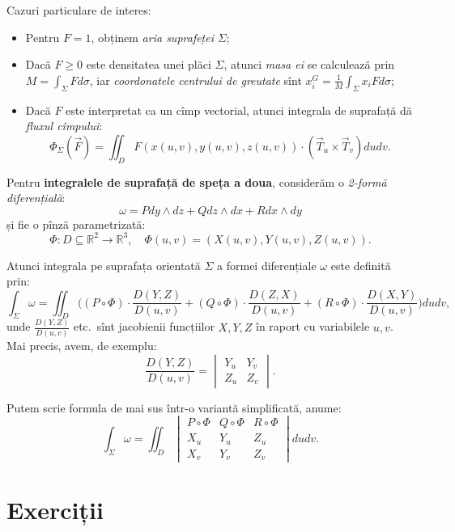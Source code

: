 \documentclass[11pt,a4paper]{article}
\newcommand\ds{\displaystyle}
\newcommand\seq{\subseteq}
\newcommand\RR{\mathbb{R}}
\theoremstyle{dotless}
\theoremstyle{dotlessdr}
\begin{document}
Cazuri particulare de interes:
\begin{itemize}
\item Pentru $ F = 1 $, obținem \emph{aria suprafeței} $ \Sigma $;
\item Dacă $ F \geq 0 $ este densitatea unei plăci $ \Sigma $, atunci \emph{masa ei} se
  calculează prin $ M = \ds\int_\Sigma F d\sigma $, iar \emph{coordonatele centrului de %
    greutate} sînt $ x_i^G = \frac{1}{M} \ds\int_\Sigma x_i F d\sigma $;
\item Dacă $ F $ este interpretat ca un cîmp vectorial, atunci integrala de suprafață
  dă \emph{fluxul cîmpului}:
  \[
    \Phi_\Sigma(\vec{F}) = \iint_D F(x(u, v), y(u, v), z(u, v)) \cdot %
    (\vec{T}_u \times \vec{T}_v) dudv.
  \]
\end{itemize}

\vspace{1cm}

Pentru \textbf{integralele de suprafață de speța a doua}, considerăm o
\emph{2-formă diferențială}:
\[
  \omega = Pdy \wedge dz + Q dz \wedge dx + R dx \wedge dy
\]
și fie o pînză parametrizată:
\[
  \Phi : D \seq \RR^2 \to \RR^3, \quad \Phi(u, v) = (X(u, v), Y(u, v), Z(u, v)).
\]

Atunci integrala pe suprafața orientată $ \Sigma $ a formei diferențiale $ \omega $
este definită prin:
\[
  \int_\Sigma \omega = \iint_D \Big( (P \circ \Phi) \cdot \frac{D(Y,Z)}{D(u,v)} + %
  (Q \circ \Phi) \cdot \frac{D(Z, X)}{D(u,v)} + %
  (R \circ \Phi) \cdot \frac{D(X, Y)}{D(u, v)} \Big) dudv,
\]
unde $ \frac{D(Y, Z)}{D(u, v)} $ etc.\ sînt jacobienii funcțiilor $ X, Y, Z $ în
raport cu variabilele $ u, v $. Mai precis, avem, de exemplu:
\[
  \frac{D(Y, Z)}{D(u, v)} =
  \begin{vmatrix}
    Y_u & Y_v \\
    Z_u & Z_v
  \end{vmatrix}.
\]

Putem scrie formula de mai sus într-o variantă simplificată, anume:
\[
  \int_\Sigma \omega = \iint_D %
  \begin{vmatrix}
    P\circ \Phi & Q \circ \Phi & R \circ \Phi \\
    X_u & Y_u & Z_u \\
    X_v & Y_v & Z_v
  \end{vmatrix}
  dudv.
\]



\section*{Exerciții}
\end{document}
